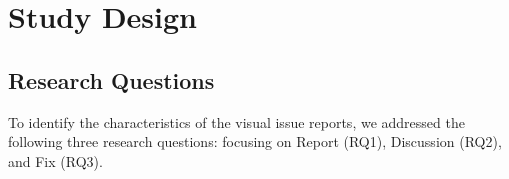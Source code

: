 \section{Study Design}
\label{sec:design}


\subsection{Research Questions}
\label{sec:rqs}

To identify the characteristics of the visual issue reports, we addressed the following three research questions: focusing on Report (RQ1), Discussion (RQ2), and Fix (RQ3). 
